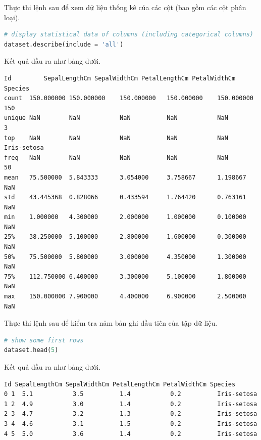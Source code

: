 Thực thi lệnh sau để xem dữ liệu thống kê của các cột (bao gồm các cột phân loại).

\begin{center}
\begin{lstlisting}[language=Python,breaklines=true]
# display statistical data of columns (including categorical columns)
dataset.describe(include = 'all')
\end{lstlisting}
\end{center}

Kết quả đầu ra như bảng dưới.

\begin{center}
\begin{lstlisting}[basicstyle=\fontsize{8.5}{13}\selectfont\ttfamily]
       Id         SepalLengthCm SepalWidthCm PetalLengthCm PetalWidthCm Species
count  150.000000 150.000000    150.000000   150.000000    150.000000   150
unique NaN        NaN           NaN          NaN           NaN          3
top    NaN        NaN           NaN          NaN           NaN          Iris-setosa
freq   NaN        NaN           NaN          NaN           NaN          50
mean   75.500000  5.843333      3.054000     3.758667      1.198667     NaN
std    43.445368  0.828066      0.433594     1.764420      0.763161     NaN
min    1.000000   4.300000      2.000000     1.000000      0.100000     NaN
25%    38.250000  5.100000      2.800000     1.600000      0.300000     NaN
50%    75.500000  5.800000      3.000000     4.350000      1.300000     NaN
75%    112.750000 6.400000      3.300000     5.100000      1.800000     NaN
max    150.000000 7.900000      4.400000     6.900000      2.500000     NaN
\end{lstlisting}
\end{center}

Thực thi lệnh sau để kiểm tra năm bản ghi đầu tiên của tập dữ liệu.

\begin{center}
\begin{lstlisting}[language=Python,breaklines=true]
# show some first rows
dataset.head(5)
\end{lstlisting}
\end{center}

Kết quả đầu ra như bảng dưới.

\begin{center}
\begin{lstlisting}[basicstyle=\fontsize{10}{13}\selectfont\ttfamily]
  Id SepalLengthCm SepalWidthCm PetalLengthCm PetalWidthCm Species
0 1  5.1           3.5          1.4           0.2          Iris-setosa
1 2  4.9           3.0          1.4           0.2          Iris-setosa
2 3  4.7           3.2          1.3           0.2          Iris-setosa
3 4  4.6           3.1          1.5           0.2          Iris-setosa
4 5  5.0           3.6          1.4           0.2          Iris-setosa
\end{lstlisting}
\end{center}

